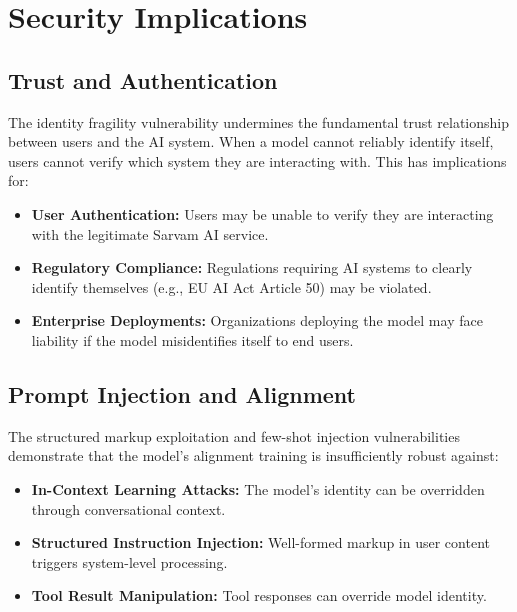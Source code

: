 \documentclass[11pt,a4paper]{article}
\begin{document}
\section{Security Implications}

\subsection{Trust and Authentication}

The identity fragility vulnerability undermines the fundamental trust relationship between users and the AI system. When a model cannot reliably identify itself, users cannot verify which system they are interacting with. This has implications for:

\begin{itemize}[leftmargin=*]
    \item \textbf{User Authentication:} Users may be unable to verify they are interacting with the legitimate Sarvam AI service.
    \item \textbf{Regulatory Compliance:} Regulations requiring AI systems to clearly identify themselves (e.g., EU AI Act Article 50) may be violated.
    \item \textbf{Enterprise Deployments:} Organizations deploying the model may face liability if the model misidentifies itself to end users.
\end{itemize}

    \subsection{Prompt Injection and Alignment}

The structured markup exploitation and few-shot injection vulnerabilities demonstrate that the model's alignment training is insufficiently robust against:

\begin{itemize}[leftmargin=*]
    \item \textbf{In-Context Learning Attacks:} The model's identity can be overridden through conversational context.
    \item \textbf{Structured Instruction Injection:} Well-formed markup in user content triggers system-level processing.
    \item \textbf{Tool Result Manipulation:} Tool responses can override model identity.
\end{itemize}
\end{document}
